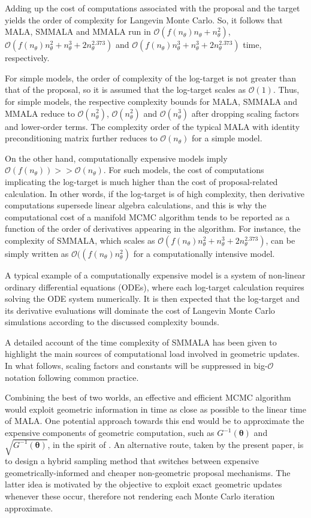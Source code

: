 \documentclass[twoside,11pt]{article}
\begin{document}
Adding up the cost of computations associated with the proposal and the target yields the order of complexity for Langevin
Monte Carlo. So, it follows that MALA, SMMALA and MMALA run in $\mathcal{O}(f(n_{\theta})n_{\theta}+n_\theta^2)$, 
$\mathcal{O}(f(n_{\theta})n_\theta^2+n_\theta^3+2n_\theta^{2.373})$ and 
$\mathcal{O}(f(n_{\theta})n_{\theta}^3+n_\theta^3+2n_\theta^{2.373})$ time, respectively.

For simple models, the order of complexity of the log-target is not greater than that of the proposal, so it is assumed that
the log-target scales as $\mathcal{O}(1)$. Thus, for simple models, the respective complexity bounds for MALA, SMMALA and
MMALA reduce to $\mathcal{O}(n_{\theta}^2)$, $\mathcal{O}(n_{\theta}^2)$ and $\mathcal{O}(n_{\theta}^3)$ after dropping
scaling factors and lower-order terms. The complexity order of the typical MALA with identity preconditioning matrix further
reduces to $\mathcal{O}(n_{\theta})$ for a simple model.

On the other hand, computationally expensive models imply $\mathcal{O}(f(n_{\theta}))>>\mathcal{O}(n_{\theta})$. For such
models, the cost of computations implicating the log-target is much higher than the cost of proposal-related calculation. In 
other words, if the log-target is of high complexity, then derivative computations supersede linear algebra calculations, 
and this is why the computational cost of a manifold MCMC algorithm tends to be reported as a function of the order of 
derivatives appearing in the algorithm. For instance, the complexity of SMMALA, which scales as 
$\mathcal{O}(f(n_{\theta})n_\theta^2+n_\theta^3+2n_\theta^{2.373})$, can be simply written as 
$\mathcal{O}((f(n_{\theta})n_\theta^2)$ for a computationally intensive model.

A typical example of a computationally expensive model is a system of non-linear ordinary differential equations (ODEs), 
where each log-target calculation requires solving the ODE system numerically. It is then expected that the log-target and 
its derivative evaluations will dominate the cost of Langevin Monte Carlo simulations according to the discussed complexity
bounds.

A detailed account of the time complexity of SMMALA has been given to highlight the main sources of computational load
involved in geometric updates. In what follows, scaling factors and constants will be suppressed in big-$\mathcal{O}$ 
notation following common practice.

Combining the best of two worlds, an effective and efficient MCMC algorithm would exploit geometric information in time as 
close as possible to the linear time of MALA. One potential approach towards this end would be to approximate the expensive 
components of geometric computation, such as $G^{-1}(\boldsymbol{\theta})$ and $\sqrt{G^{-1}(\boldsymbol{\theta})}$, in the 
spirit of \cite{sim_bad_cem__sto}. An alternative route, taken by the present paper, is to design a hybrid sampling method 
that switches between expensive geometrically-informed and cheaper non-geometric proposal mechanisms. The latter idea is
motivated by the objective to exploit exact geometric updates whenever these occur, therefore not rendering each Monte Carlo 
iteration approximate.
\end{document}
